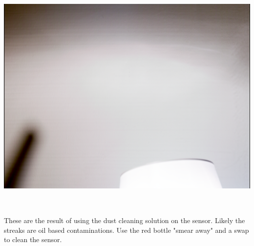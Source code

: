 \begin{center}
\includegraphics[height=12cm]{images/Vertical-streaks}
\end{center}

These are the result of using the dust cleaning solution on the sensor. Likely the streaks are oil based contaminations. Use the red bottle "smear away" and a swap to clean the sensor. 
